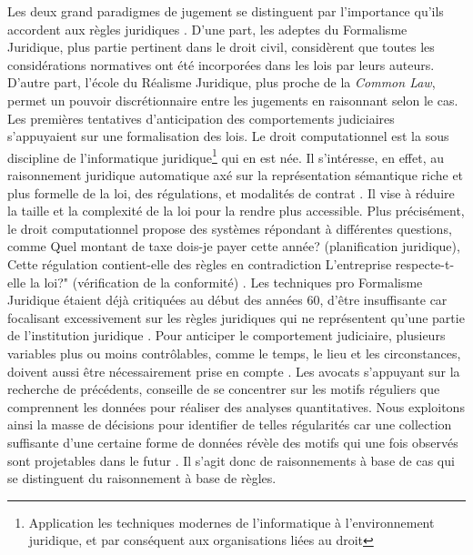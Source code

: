 Les deux grand paradigmes de jugement se distinguent par l'importance qu'ils accordent aux règles juridiques \citep{tumonis2012legalrealism}. D'une part, les adeptes du Formalisme Juridique, plus partie pertinent dans le droit civil, considèrent que toutes les considérations normatives ont été incorporées dans les lois par leurs auteurs. D'autre part, l'école du Réalisme Juridique, plus proche de la \og \textit{Common Law}\fg{}, permet un pouvoir discrétionnaire entre les jugements en raisonnant selon le cas. Les premières tentatives d'anticipation des comportements judiciaires s'appuyaient sur une formalisation des lois. Le \og droit computationnel \fg{} est la sous discipline de  l'\og informatique juridique\footnote{Application les techniques modernes de l'informatique à l'environnement juridique, et par conséquent aux organisations liées au droit} \fg{} qui en est née. Il  s'intéresse, en effet, au raisonnement juridique automatique  axé sur la représentation sémantique riche et plus formelle de la loi, des régulations, et modalités de contrat \citep{love2005computationallaw}. Il vise à réduire la taille et la complexité de la loi pour la rendre plus accessible. Plus précisément, le \og droit computationnel \fg{} propose des systèmes répondant à différentes questions, comme \og Quel montant de taxe dois-je payer cette année? \fg{} (planification juridique), \og Cette régulation contient-elle des règles en contradiction\fg{} \og L'entreprise respecte-t-elle la loi?" (vérification de la conformité) \citep{Genesereth2015computationallaw}. Les techniques pro Formalisme Juridique étaient déjà critiquées au début des années 60, d'être insuffisante car focalisant excessivement sur les règles juridiques qui ne représentent qu'une partie de l'institution juridique \citep{llewellyn1962jurisprudence}. Pour anticiper le comportement judiciaire, plusieurs variables plus ou moins contrôlables, comme le temps, le lieu et les circonstances, doivent aussi être nécessairement prise en compte \citep{ulmer1963quantitative}. Les avocats s'appuyant sur la recherche de précédents, \citet{ulmer1963quantitative} conseille de se concentrer sur les motifs réguliers que comprennent les données pour réaliser des analyses quantitatives. Nous exploitons ainsi la masse de décisions pour identifier de telles régularités car une collection suffisante d'une certaine forme de données révèle des motifs qui une fois observés sont projetables dans le futur \citep{ulmer1963quantitative}. Il s'agit donc de raisonnements à base de cas qui se distinguent du raisonnement à base de règles.

